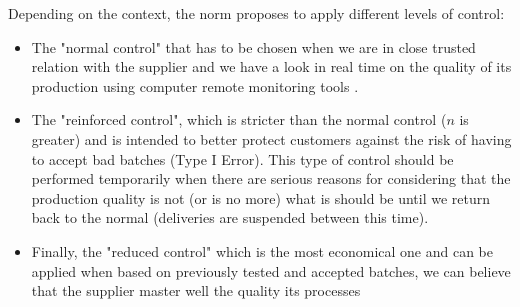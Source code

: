 	Depending on the context, the norm proposes to apply different levels of control:
	\begin{itemize}
		\item The "normal control" that has to be chosen when we are in close trusted relation with the supplier and we have a look in real time on the quality of its production using computer remote monitoring tools .

		\item The "reinforced control", which is stricter than the normal control ($n$ is greater) and is intended to better protect customers against the risk of having to accept bad batches (Type I Error). This type of control should be performed temporarily when there are serious reasons for considering that the production quality is not (or is no more) what is should be until we return back to the normal (deliveries are suspended between this time).

		\item Finally, the "reduced control" which is the most economical one and can be applied when based on previously tested and accepted batches, we can believe that the supplier master well the quality its processes
	\end{itemize}

